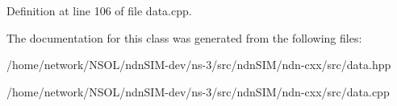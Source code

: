 Definition at line 106 of file data.\+cpp.



The documentation for this class was generated from the following files\+:\begin{DoxyCompactItemize}
\item 
/home/network/\+N\+S\+O\+L/ndn\+S\+I\+M-\/dev/ns-\/3/src/ndn\+S\+I\+M/ndn-\/cxx/src/data.\+hpp\item 
/home/network/\+N\+S\+O\+L/ndn\+S\+I\+M-\/dev/ns-\/3/src/ndn\+S\+I\+M/ndn-\/cxx/src/data.\+cpp\end{DoxyCompactItemize}
